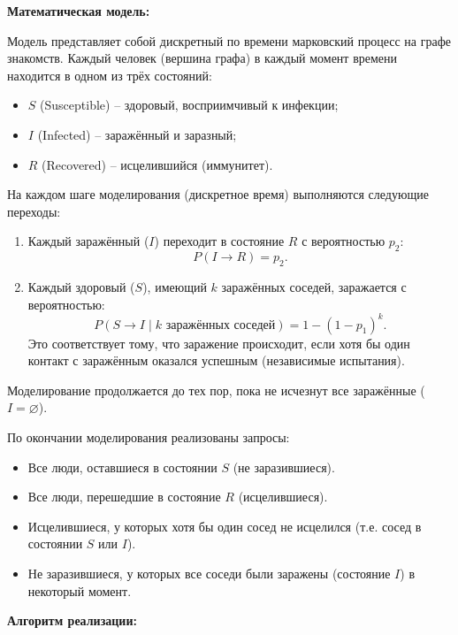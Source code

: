 \documentclass[a4paper]{article}
\theoremstyle{definition}
\begin{document}
\textbf{Математическая модель:}

Модель представляет собой дискретный по времени марковский процесс на графе знакомств. Каждый человек (вершина графа) в каждый момент времени находится в одном из трёх состояний:
\begin{itemize}
    \item $S$ (Susceptible) – здоровый, восприимчивый к инфекции;
    \item $I$ (Infected) – заражённый и заразный;
    \item $R$ (Recovered) – исцелившийся (иммунитет).
\end{itemize}

На каждом шаге моделирования (дискретное время) выполняются следующие переходы:
\begin{enumerate}
    \item Каждый заражённый ($I$) переходит в состояние $R$ с вероятностью $p_2$:
    \begin{equation}
        P(I \to R) = p_2. \tag{2.1}
    \end{equation}
    \item Каждый здоровый ($S$), имеющий $k$ заражённых соседей, заражается с вероятностью:
    \begin{equation}
        P(S \to I \mid k \text{ заражённых соседей}) = 1 - (1 - p_1)^k. \tag{2.2}
    \end{equation}
    Это соответствует тому, что заражение происходит, если хотя бы один контакт с заражённым оказался успешным (независимые испытания).
\end{enumerate}

Моделирование продолжается до тех пор, пока не исчезнут все заражённые ($I = \varnothing$).

По окончании моделирования реализованы запросы:
\begin{itemize}
    \item Все люди, оставшиеся в состоянии $S$ (не заразившиеся).
    \item Все люди, перешедшие в состояние $R$ (исцелившиеся).
    \item Исцелившиеся, у которых хотя бы один сосед не исцелился (т.е. сосед в состоянии $S$ или $I$).
    \item Не заразившиеся, у которых все соседи были заражены (состояние $I$) в некоторый момент.
\end{itemize}

\textbf{Алгоритм реализации:}
\end{document}
